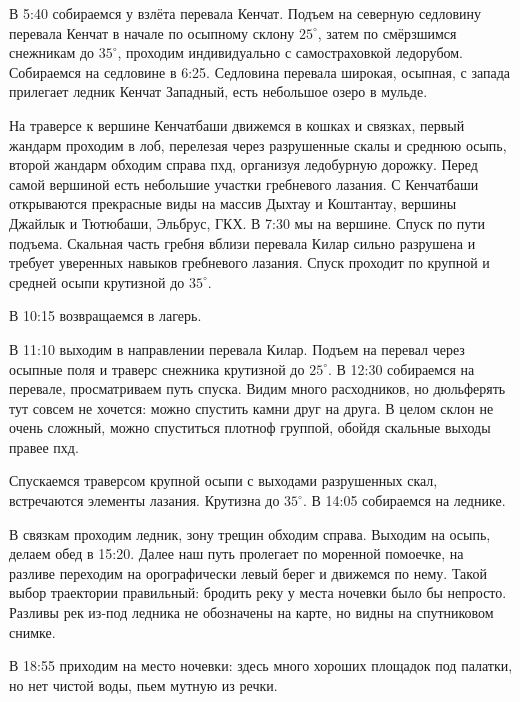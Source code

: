 В 5:40 собираемся у взлёта перевала Кенчат. Подъем на северную седловину перевала Кенчат в начале
по осыпному склону $25^\circ$, затем по смёрзшимся снежникам до $35^\circ$, проходим индивидуально с самостраховкой ледорубом. Собираемся на седловине в 6:25. Седловина перевала широкая, осыпная, с запада прилегает ледник Кенчат Западный, есть небольшое озеро в мульде.

На траверсе к вершине Кенчатбаши движемся в кошках и связках, первый жандарм проходим в
лоб, перелезая через разрушенные скалы и среднюю осыпь, второй жандарм обходим справа
пхд, организуя ледобурную дорожку. Перед самой вершиной есть небольшие участки гребневого
лазания. С Кенчатбаши открываются прекрасные виды на массив Дыхтау и Коштантау, вершины
Джайлык и Тютюбаши, Эльбрус, ГКХ. В 7:30 мы на вершине. Спуск по пути подъема. Скальная
часть гребня вблизи перевала Килар сильно разрушена и требует уверенных навыков гребневого лазания. Спуск проходит по крупной и средней осыпи крутизной до $35^\circ$.

В 10:15 возвращаемся в лагерь.

В 11:10 выходим в направлении перевала Килар. Подъем на перевал через осыпные поля и траверс снежника крутизной до $25^\circ$. В 12:30 собираемся на перевале, просматриваем путь спуска. Видим много расходников, но дюльферять тут совсем не хочется: можно спустить камни друг на друга. В целом склон не очень сложный, можно спуститься плотноф группой, обойдя скальные выходы правее пхд.

Спускаемся траверсом крупной осыпи с выходами разрушенных скал, встречаются элементы лазания. Крутизна до $35^\circ$. В 14:05 собираемся на леднике.

В связкам проходим ледник, зону трещин обходим справа. Выходим на осыпь, делаем обед в 15:20.
Далее наш путь пролегает по моренной помоечке, на разливе переходим на орографически левый берег и движемся по нему. Такой выбор траектории правильный: бродить реку у места ночевки было бы непросто. Разливы рек из-под ледника не обозначены на карте, но видны на спутниковом снимке.

В 18:55 приходим на место ночевки: здесь много хороших площадок под палатки, но нет чистой воды, пьем мутную из речки.





